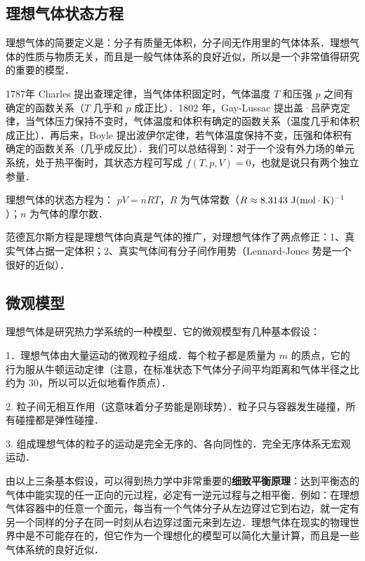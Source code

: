 
\begin{issues}
\issueDraft
\end{issues}

\subsection{理想气体状态方程}

理想气体的简要定义是：分子有质量无体积，分子间无作用里的气体体系．理想气体的性质与物质无关，而且是一般气体体系的良好近似，所以是一个非常值得研究的重要的模型．

1787年 Charles 提出查理定律，当气体体积固定时，气体温度 $T$ 和压强 $p$ 之间有确定的函数关系（$T$ 几乎和 $p$ 成正比）．1802 年，Gay-Lussac 提出盖·吕萨克定律，当气体压力保持不变时，气体温度和体积有确定的函数关系（温度几乎和体积成正比）．再后来，Boyle 提出波伊尔定律，若气体温度保持不变，压强和体积有确定的函数关系（几乎成反比）．我们可以总结得到：对于一个没有外力场的单元系统，处于热平衡时，其状态方程可写成 $f(T,p,V)=0$，也就是说只有两个独立参量．

理想气体的状态方程为： $pV=nRT$，$R$ 为气体常数（$R\approx 8.3143\ \rm{J}(\rm{mol\cdot K})^{-1}$）；$n$ 为气体的摩尔数．

范德瓦尔斯方程是理想气体向真是气体的推广，对理想气体作了两点修正：1、真实气体占据一定体积；2、真实气体间有分子间作用势（Lennard-Jones 势是一个很好的近似）．

\subsection{微观模型}

理想气体是研究热力学系统的一种模型．它的微观模型有几种基本假设：

1．理想气体由大量运动的微观粒子组成．每个粒子都是质量为 $m$ 的质点，它的行为服从牛顿运动定律（注意，在标准状态下气体分子间平均距离和气体半径之比约为 $30$，所以可以近似地看作质点）．

2. 粒子间无相互作用（这意味着分子势能是刚球势）．粒子只与容器发生碰撞，所有碰撞都是弹性碰撞．

3. 组成理想气体的粒子的运动是完全无序的、各向同性的．完全无序体系无宏观运动．

由以上三条基本假设，可以得到热力学中非常重要的\textbf{细致平衡原理}：达到平衡态的气体中能实现的任一正向的元过程，必定有一逆元过程与之相平衡．例如：在理想气体容器中的任意一个面元，每当有一个气体分子从左边穿过它到右边，就一定有另一个同样的分子在同一时刻从右边穿过面元来到左边．理想气体在现实的物理世界中是不可能存在的，但它作为一个理想化的模型可以简化大量计算，而且是一些气体系统的良好近似．